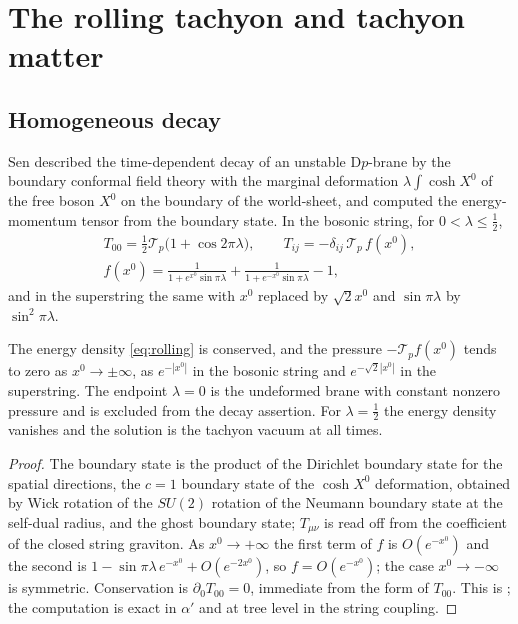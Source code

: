 \section{The rolling tachyon and tachyon matter}\label{sec:rolling}

\subsection{Homogeneous decay}\label{ssec:homogeneous}

Sen \cite{Sen02rolling} described the time-dependent decay of an unstable D$p$-brane by the boundary conformal field theory with the marginal deformation $\lambda\int \cosh X^0$ of the free boson $X^0$ on the boundary of the world-sheet, and computed the energy-momentum tensor from the boundary state. In the bosonic string, for $0<\lambda\le\frac12$,
\begin{equation}\label{eq:rolling}
\begin{gathered}
T_{00} = \tfrac{1}{2}\mathcal T_p\big(1+\cos 2\pi\lambda\big) ,\qquad
T_{ij} = -\delta_{ij}\,\mathcal T_p\,f(x^0),\\
f(x^0) = \frac{1}{1+e^{x^0}\sin\pi\lambda} + \frac{1}{1+e^{-x^0}\sin\pi\lambda} - 1 ,
\end{gathered}
\end{equation}
and in the superstring the same with $x^0$ replaced by $\sqrt2 x^0$ and $\sin\pi\lambda$ by $\sin^2\pi\lambda$.

\begin{theorem}\label{thm:homogeneous}
The energy density \eqref{eq:rolling} is conserved, and the pressure $-\mathcal T_p f(x^0)$ tends to zero as $x^0\to\pm\infty$, as $e^{-|x^0|}$ in the bosonic string and $e^{-\sqrt2|x^0|}$ in the superstring. The endpoint $\lambda=0$ is the undeformed brane with constant nonzero pressure and is excluded from the decay assertion. For $\lambda=\frac12$ the energy density vanishes and the solution is the tachyon vacuum at all times.
\end{theorem}

\begin{proof}
The boundary state is the product of the Dirichlet boundary state for the spatial directions, the $c=1$ boundary state of the $\cosh X^0$ deformation, obtained by Wick rotation of the $SU(2)$ rotation of the Neumann boundary state at the self-dual radius, and the ghost boundary state; $T_{\mu\nu}$ is read off from the coefficient of the closed string graviton. As $x^0\to+\infty$ the first term of $f$ is $O(e^{-x^0})$ and the second is $1 - \sin\pi\lambda\, e^{-x^0} + O(e^{-2x^0})$, so $f = O(e^{-x^0})$; the case $x^0\to-\infty$ is symmetric. Conservation is $\partial_0 T_{00}=0$, immediate from the form of $T_{00}$. This is \cite[Section~3]{Sen02rolling}; the computation is exact in $\alpha'$ and at tree level in the string coupling.
\end{proof}

